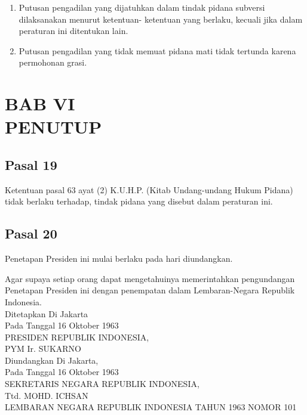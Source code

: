\documentclass{article}
\begin{document}
\begin{enumerate}
\item Putusan pengadilan yang dijatuhkan dalam tindak pidana subversi dilaksanakan menurut ketentuan-
ketentuan yang berlaku, kecuali jika dalam peraturan ini ditentukan lain.
\item Putusan pengadilan yang tidak memuat pidana mati tidak tertunda karena permohonan grasi.
\end{enumerate}

\section*{\centering{}BAB VI\\PENUTUP}

\subsection*{\centering{}Pasal 19}

Ketentuan pasal 63 ayat (2) K.U.H.P. (Kitab Undang-undang Hukum Pidana) tidak berlaku terhadap, tindak
pidana yang disebut dalam peraturan ini.

\subsection*{\centering{}Pasal 20}

Penetapan Presiden ini mulai berlaku pada hari diundangkan.

Agar supaya setiap orang dapat mengetahuinya memerintahkan pengundangan Penetapan Presiden ini
dengan penempatan dalam Lembaran-Negara Republik Indonesia.
\\

Ditetapkan Di Jakarta\\
Pada Tanggal 16 Oktober 1963\\
PRESIDEN REPUBLIK INDONESIA,\\
PYM Ir. SUKARNO
\\

Diundangkan Di Jakarta,\\
Pada Tanggal 16 Oktober 1963\\
SEKRETARIS NEGARA REPUBLIK INDONESIA,\\
Ttd. MOHD. ICHSAN\\
LEMBARAN NEGARA REPUBLIK INDONESIA TAHUN 1963 NOMOR 101
\end{document}
